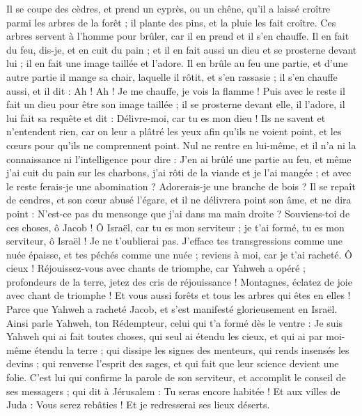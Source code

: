 \begin{multicols}{2}
Il se coupe des cèdres, et prend un cyprès, ou un chêne, qu'il a laissé croître parmi les arbres de la forêt ; il plante des pins, et la pluie les fait croître.
Ces arbres servent à l'homme pour brûler, car il en prend et il s'en chauffe. Il en fait du feu, dis-je, et en cuit du pain ; et il en fait aussi un dieu et se prosterne devant lui ; il en fait une image taillée et l'adore.
Il en brûle au feu une partie, et d'une autre partie il mange sa chair, laquelle il rôtit, et s'en rassasie ; il s'en chauffe aussi, et il dit : Ah ! Ah ! Je me chauffe, je vois la flamme !
Puis avec le reste il fait un dieu pour être son image taillée ; il se prosterne devant elle, il l'adore, il lui fait sa requête et dit : Délivre-moi, car tu es mon dieu !
Ils ne savent et n'entendent rien, car on leur a plâtré les yeux afin qu'ils ne voient point, et les cœurs pour qu'ils ne comprennent point.
Nul ne rentre en lui-même, et il n'a ni la connaissance ni l'intelligence pour dire : J'en ai brûlé une partie au feu, et même j'ai cuit du pain sur les charbons, j'ai rôti de la viande et je l'ai mangée ; et avec le reste ferais-je une abomination ? Adorerais-je une branche de bois ?
Il se repaît de cendres, et son cœur abusé l'égare, et il ne délivrera point son âme, et ne dira point : N'est-ce pas du mensonge que j'ai dans ma main droite ?
Souviens-toi de ces choses, ô Jacob ! Ô Israël, car tu es mon serviteur ; je t'ai formé, tu es mon serviteur, ô Israël ! Je ne t'oublierai pas.
J'efface tes transgressions comme une nuée épaisse, et tes péchés comme une nuée ; reviens à moi, car je t'ai racheté.
Ô cieux ! Réjouissez-vous avec chants de triomphe, car Yahweh a opéré ; profondeurs de la terre, jetez des cris de réjouissance ! Montagnes, éclatez de joie avec chant de triomphe ! Et vous aussi forêts et tous les arbres qui êtes en elles ! Parce que Yahweh a racheté Jacob, et s'est manifesté glorieusement en Israël.
Ainsi parle Yahweh, ton Rédempteur, celui qui t'a formé dès le ventre : Je suis Yahweh qui ai fait toutes choses, qui seul ai étendu les cieux, et qui ai par moi-même étendu la terre ;
qui dissipe les signes des menteurs, qui rends insensés les devins ; qui renverse l'esprit des sages, et qui fait que leur science devient une folie.
C'est lui qui confirme la parole de son serviteur, et accomplit le conseil de ses messagers ; qui dit à Jérusalem : Tu seras encore habitée ! Et aux villes de Juda : Vous serez rebâties ! Et je redresserai ses lieux déserts.

\end{multicols}
